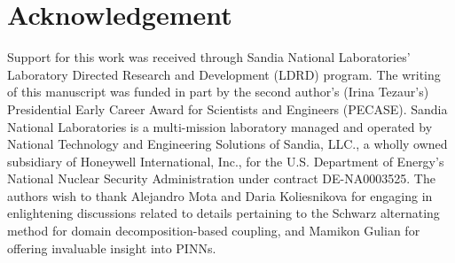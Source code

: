 \documentclass[oneside,final]{csri23}
\begin{document}
\section*{Acknowledgement} \label{WDS:sec:ackn}

Support for this work was received through Sandia National Laboratories' Laboratory Directed Research and Development (LDRD) program. The writing of this manuscript was funded in part by the second author’s (Irina
Tezaur’s) Presidential Early Career Award for Scientists and Engineers (PECASE). Sandia National Laboratories
is a multi-mission laboratory managed and operated by National Technology and Engineering Solutions of Sandia,
LLC., a wholly owned subsidiary of Honeywell International, Inc., for the U.S. Department of Energy’s National
Nuclear Security Administration under contract DE-NA0003525.
The authors wish to thank Alejandro Mota and Daria Koliesnikova for engaging in enlightening discussions related to details pertaining to the Schwarz alternating method for domain decomposition-based coupling, and Mamikon Gulian for offering invaluable insight into PINNs.  




%
\end{document}
